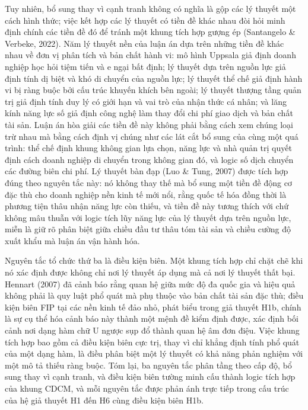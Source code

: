 \documentclass[
  a4paper,
  13pt]{extreport}
\begin{document}
Tuy nhiên, bổ sung thay vì cạnh tranh không có nghĩa là gộp các lý
thuyết một cách hình thức; việc kết hợp các lý thuyết có tiền đề khác
nhau đòi hỏi minh định chính các tiền đề đó để tránh một khung tích hợp
gượng ép (Santangelo \& Verbeke, 2022). Năm lý thuyết nền của luận án
dựa trên những tiền đề khác nhau về đơn vị phân tích và bản chất hành
vi: mô hình Uppsala giả định doanh nghiệp học hỏi tiệm tiến và e ngại
bất định; lý thuyết dựa trên nguồn lực giả định tính dị biệt và khó di
chuyển của nguồn lực; lý thuyết thể chế giả định hành vi bị ràng buộc
bởi cấu trúc khuyến khích bên ngoài; lý thuyết thượng tầng quản trị giả
định tính duy lý có giới hạn và vai trò của nhận thức cá nhân; và lăng
kính năng lực số giả định công nghệ làm thay đổi chi phí giao dịch và
bản chất tài sản. Luận án hòa giải các tiền đề này không phải bằng cách
xem chúng loại trừ nhau mà bằng cách định vị chúng như các lát cắt bổ
sung của cùng một quá trình: thể chế định khung không gian lựa chọn,
năng lực và nhà quản trị quyết định cách doanh nghiệp di chuyển trong
không gian đó, và logic số dịch chuyển các đường biên chi phí. Lý thuyết
bàn đạp (Luo \& Tung, 2007) được tích hợp đúng theo nguyên tắc này: nó
không thay thế mà bổ sung một tiền đề động cơ đặc thù cho doanh nghiệp
nền kinh tế mới nổi, rằng quốc tế hóa đồng thời là phương tiện thâu nhận
năng lực còn thiếu, và tiền đề này tương thích với chứ không mâu thuẫn
với logic tích lũy năng lực của lý thuyết dựa trên nguồn lực, miễn là
giữ rõ phân biệt giữa chiều đầu tư thâu tóm tài sản và chiều cường độ
xuất khẩu mà luận án vận hành hóa.

Nguyên tắc tổ chức thứ ba là điều kiện biên. Một khung tích hợp chỉ chặt
chẽ khi nó xác định được không chỉ nơi lý thuyết áp dụng mà cả nơi lý
thuyết thất bại. Hennart (2007) đã cảnh báo rằng quan hệ giữa mức độ đa
quốc gia và hiệu quả không phải là quy luật phổ quát mà phụ thuộc vào
bản chất tài sản đặc thù; điều kiện biên FIP tại các nền kinh tế đảo
nhỏ, phát biểu trong giả thuyết H1b, chính là sự cụ thể hóa cảnh báo này
thành một mệnh đề kiểm định được, xác định bối cảnh nơi dạng hàm chữ U
ngược sụp đổ thành quan hệ âm đơn điệu. Việc khung tích hợp bao gồm cả
điều kiện biên cực trị, thay vì chỉ khẳng định tính phổ quát của một
dạng hàm, là điều phân biệt một lý thuyết có khả năng phản nghiệm với
một mô tả thiếu ràng buộc. Tóm lại, ba nguyên tắc phân tầng theo cấp độ,
bổ sung thay vì cạnh tranh, và điều kiện biên tường minh cấu thành logic
tích hợp của khung CDCM, và mỗi nguyên tắc được phản ánh trực tiếp trong
cấu trúc của hệ giả thuyết H1 đến H6 cùng điều kiện biên H1b.
\end{document}
